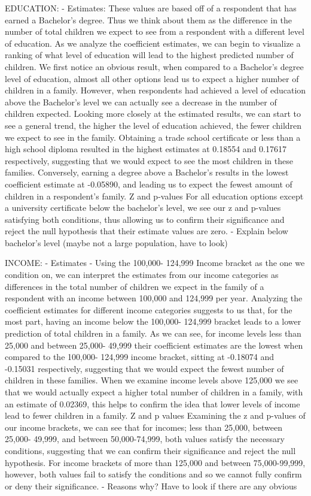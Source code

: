 \documentclass[
]{article}
\begin{document}
EDUCATION: - Estimates: These values are based off of a respondent that
has earned a Bachelor's degree. Thus we think about them as the
difference in the number of total children we expect to see from a
respondent with a different level of education. As we analyze the
coefficient estimates, we can begin to visualize a ranking of what level
of education will lead to the highest predicted number of children. We
first notice an obvious result, when compared to a Bachelor's degree
level of education, almost all other options lead us to expect a higher
number of children in a family. However, when respondents had achieved a
level of education above the Bachelor's level we can actually see a
decrease in the number of children expected. Looking more closely at the
estimated results, we can start to see a general trend, the higher the
level of education achieved, the fewer children we expect to see in the
family. Obtaining a trade school certificate or less than a high school
diploma resulted in the highest estimates at 0.18554 and 0.17617
respectively, suggesting that we would expect to see the most children
in these families. Conversely, earning a degree above a Bachelor's
results in the lowest coefficient estimate at -0.05890, and leading us
to expect the fewest amount of children in a respondent's family. Z and
p-values For all education options except a university certificate below
the bachelor's level, we see our z and p-values satisfying both
conditions, thus allowing us to confirm their significance and reject
the null hypothesis that their estimate values are zero. - Explain below
bachelor's level (maybe not a large population, have to look)

INCOME: - Estimates - Using the 100,000- 124,999 Income bracket as the
one we condition on, we can interpret the estimates from our income
categories as differences in the total number of children we expect in
the family of a respondent with an income between 100,000 and 124,999
per year. Analyzing the coefficient estimates for different income
categories suggests to us that, for the most part, having an income
below the 100,000- 124,999 bracket leads to a lower prediction of total
children in a family. As we can see, for income levels less than 25,000
and between 25,000- 49,999 their coefficient estimates are the lowest
when compared to the 100,000- 124,999 income bracket, sitting at
-0.18074 and -0.15031 respectively, suggesting that we would expect the
fewest number of children in these families. When we examine income
levels above 125,000 we see that we would actually expect a higher total
number of children in a family, with an estimate of 0.02369, this helps
to confirm the idea that lower levels of income lead to fewer children
in a family. Z and p values Examining the z and p-values of our income
brackets, we can see that for incomes; less than 25,000, between 25,000-
49,999, and between 50,000-74,999, both values satisfy the necessary
conditions, suggesting that we can confirm their significance and reject
the null hypothesis. For income brackets of more than 125,000 and
between 75,000-99,999, however, both values fail to satisfy the
conditions and so we cannot fully confirm or deny their significance. -
Reasons why? Have to look if there are any obvious
\end{document}
